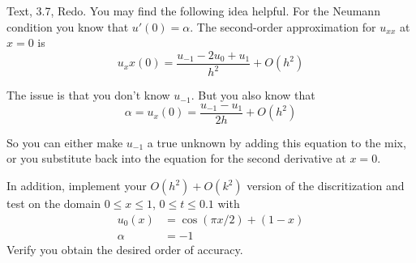 \documentclass[minion]{homework}
\begin{document}
\begin{problems}
\problem Text, 3.7, Redo.  You may find the following idea helpful.
For the Neumann condition you know that $u'(0)=\alpha$.  The second-order approximation for $u_{xx}$ at $x=0$ is
\[
u_xx(0) = \frac{u_{-1}-2u_0 + u_1}{h^2} + O(h^2)
\]

The issue is that you don't know $u_{-1}$.  But you also know that
\[
\alpha = u_x(0) = \frac{u_{-1}-u_1}{2h} + O(h^2)
\]

So you can either make $u_{-1}$ a true unknown by adding this equation to the mix, or you substitute back into the equation for the second derivative at $x=0$.

In addition, implement your $O(h^2)+O(k^2)$ version of the discritization
and test on the domain $0\le x\le 1$, $0\le t \le 0.1$ with 
\begin{equation}
\begin{aligned} 
u_0(x) &=\cos(\pi x/2) + (1-x)\\
\alpha &= -1
\end{aligned}
\end{equation}
Verify you obtain the desired order of accuracy.

\end{problems}
\end{document}
